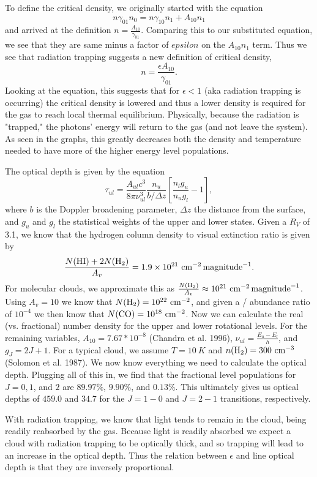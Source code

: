 \documentclass[11pt]{article}
\newenvironment{tight_enumerate}{
\begin{enumerate}[label=(\alph*)]
\setlength{\itemsep}{3pt}
\setlength{\parskip}{0pt}
}{\end{enumerate}}
\begin{document}
\begin{tight_enumerate}
\begin{figure}[H]
\end{figure}
\item To define the critical density, we originally started with the equation 
\[n\gamma_{01}n_{0} = n\gamma_{10}n_{1} + A_{10}n_{1}\] 
and arrived at the definition $n = \frac{A_{10}}{\gamma_{01}}$. Comparing this to our substituted equation, we see that they are same minus a factor of $epsilon$ on the $A_{10}n_{1}$ term. Thus we see that radiation trapping suggests a new definition of critical density, 
\[n = \frac{{\epsilon}A_{10}}{\gamma_{01}}.\] 
Looking at the equation, this suggests that for $\epsilon < 1$ (aka radiation trapping is occurring) the critical density is lowered and thus a lower density is required for the gas to reach local thermal equilibrium. Physically, because the radiation is "trapped," the photons' energy will return to the gas (and not leave the system). As seen in the graphs, this greatly decreases both the  density and temperature needed to have more of the higher energy level populations.
\item The optical depth is given by the equation 
\[\tau_{ul} = \frac{A_{ul}c^{3}}{8\pi\nu_{ul}^{3}}\frac{n_{u}}{b/{\Delta}z}\left[\frac{n_{l}g_{u}}{n_{u}g_{l}}-1\right],\] 
where $b$ is the Doppler broadening parameter, ${\Delta}z$ the distance from the surface, and $g_{u}$ and $g_{l}$ the statistical weights of the upper and lower states. Given a $R_{V}$ of 3.1, we know that the hydrogen column density to visual extinction ratio is given by 
\[\frac{N(\ce{HI})+2N(\ce{H2})}{A_{v}} = 1.9 \times 10^{21}\ \si{cm^{-2}.magnitude^{-1}}.\] 
For molecular clouds, we approximate this as $\frac{N(\ce{H2})}{A_{v}} \approx 10^{21}\ \si{cm^{-2}.magnitude^{-1}}$. Using $A_{v} = 10$ we know that $N(\ce{H2}) = 10^{22}\ \si{cm^{-2}}$, and given a / abundance ratio of $10^{-4}$ we then know that $N(\ce{CO}) = 10^{18}\ \si{cm^{-2}}$. Now we can calculate the real (vs. fractional) number density for the upper and lower rotational levels. For the remaining variables, $A_{10} = 7.67*10^{-8}$ (Chandra et al. 1996), $\nu_{ul} = \frac{E_{u}-E_{l}}{h}$, and $g_{J} = 2J+1$. For a typical cloud, we assume $T = 10\ \si{K}$ and $n(\ce{H2}) = 300\ \si{cm^{-3}}$ (Solomon et al. 1987). We now know everything we need to calculate the optical depth. Plugging all of this in, we find that the fractional level populations for $J = 0, 1$, and $2$ are $89.97\%$, $9.90\%$, and $0.13\%$. This ultimately gives us optical depths of $459.0$ and $34.7$ for the $J=1-0$ and $J=2-1$ transitions, respectively.
\item With radiation trapping, we know that light tends to remain in the cloud, being readily reabsorbed by the gas. Because light is readily absorbed we expect a cloud with radiation trapping to be optically thick, and so trapping will lead to an increase in the optical depth. Thus the relation between $\epsilon$ and line optical depth is that they are inversely proportional.
\end{tight_enumerate}
\end{document}
